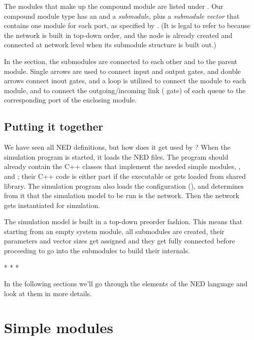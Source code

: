 The modules that make up the compound module are listed under
. Our  compound module type has an  and
a  \textit{submodule}, plus a  \textit{submodule
vector} that contains one  module for each port, as specified by
. (It is legal to refer to  because
the network is built in top-down order, and the node is already created and
connected at network level when its submodule structure is built out.)

In the  section, the submodules are connected to each
other and to the parent module. Single arrows are used to connect input and
output gates, and double arrows connect inout gates, and a  loop
is utilized to connect the  module to each  module, and
to connect the outgoing/incoming link ( gate) of each queue to the
corresponding port of the enclosing module.


\subsection{Putting it together}

We have seen all NED definitions, but how does it get used by {\opp}? When
the simulation program is started, it loads the NED files. The program
should already contain the C++ classes that implement the needed simple
modules, ,  and ; their C++ code is either
part if the executable or gets loaded from shared library. The simulation
program also loads the configuration (), and determines
from it that the simulation model to be run is the  network.
Then the network gets instantiated for simulation.

The simulation model is built in a top-down preorder fashion. This means
that starting from an empty system module, all submodules are created,
their parameters and vector sizes get assigned and they get fully connected
before proceeding to go into the submodules to build their internals.

\bigskip
\begin{center}* * *\end{center}
\bigskip

In the following sections we'll go through the elements of the NED
language and look at them in more details.



\section{Simple modules}
\label{sec:ch-ned-lang:simple-modules}

